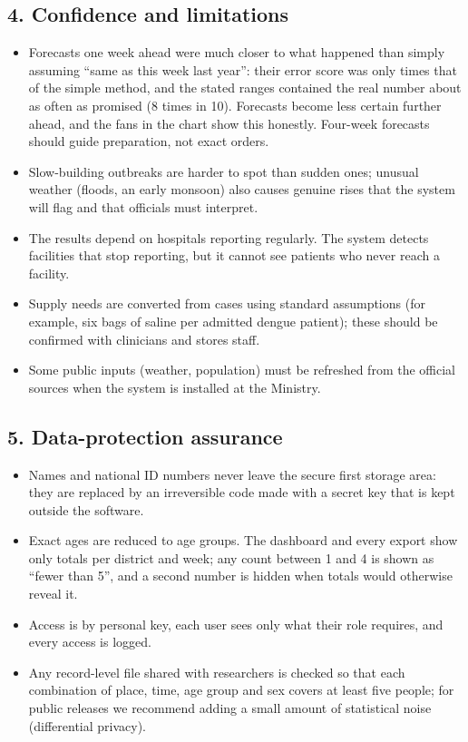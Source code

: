 \subsection*{4. Confidence and limitations}
\begin{itemize}
\item Forecasts one week ahead were much closer to what happened than simply assuming ``same as this week last
year'': their error score was only \GlmRelWISOne{} times that of the simple method, and the stated ranges
contained the real number about as often as promised (8 times in 10). Forecasts become less certain further ahead, and the
fans in the chart show this honestly. Four-week forecasts should guide preparation, not exact orders.
\item Slow-building outbreaks are harder to spot than sudden ones; unusual weather (floods, an early monsoon)
also causes genuine rises that the system will flag and that officials must interpret.
\item The results depend on hospitals reporting regularly. The system detects facilities that stop reporting,
but it cannot see patients who never reach a facility.
\item Supply needs are converted from cases using standard assumptions (for example, six bags of saline per
admitted dengue patient); these should be confirmed with clinicians and stores staff.
\item Some public inputs (weather, population) must be refreshed from the official sources when the system is
installed at the Ministry.
\end{itemize}

\subsection*{5. Data-protection assurance}
\begin{itemize}
\item Names and national ID numbers never leave the secure first storage area: they are replaced by an
irreversible code made with a secret key that is kept outside the software.
\item Exact ages are reduced to age groups. The dashboard and every export show only totals per district and
week; any count between 1 and 4 is shown as ``fewer than 5'', and a second number is hidden when totals would
otherwise reveal it.
\item Access is by personal key, each user sees only what their role requires, and every access is logged.
\item Any record-level file shared with researchers is checked so that each combination of place, time, age group
and sex covers at least five people; for public releases we recommend adding a small amount of statistical noise
(differential privacy).
\end{itemize}
